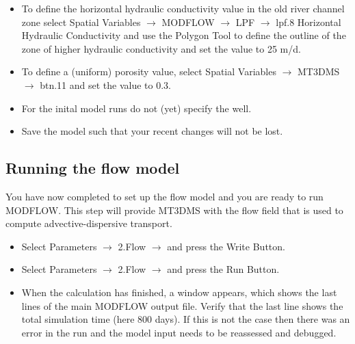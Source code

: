 \begin{itemize}
\item To define the horizontal hydraulic conductivity value in the old river channel zone
select {\color{blue}Spatial Variables} $\rightarrow$ {\color{blue}MODFLOW} $\rightarrow$ 
{\color{blue}LPF} $\rightarrow$ {\color{blue}lpf.8 Horizontal Hydraulic Conductivity} 
and use the {\color{blue}Polygon Tool} to define the outline of the zone of higher 
hydraulic conductivity and set the value to 25 m/d.
 

\item To define a (uniform) porosity value, select {\color{blue}Spatial Variables} 
$\rightarrow$ {\color{blue}MT3DMS} $\rightarrow$ {\color{blue}btn.11} 
and set the value to 0.3. 

\item For the inital model runs do not (yet) specify the well.

\item Save the model such that your recent changes will not be lost.

\end{itemize}



\subsection{Running the flow model}

You have now completed to set up the flow model and you are ready to run MODFLOW.
This step will provide MT3DMS with the flow field that is used to compute 
advective-dispersive transport.

\begin{itemize}

\item Select {\color{blue}Parameters} $\rightarrow$ {\color{blue}2.Flow} $\rightarrow$ and press 
the {\color{blue}Write Button}.

\item Select {\color{blue}Parameters} $\rightarrow$ {\color{blue}2.Flow} $\rightarrow$ and press
the {\color{blue}Run Button}.

\item When the calculation has finished, a window appears, which shows the last lines of the 
main MODFLOW output file. Verify that the last line shows the total simulation time (here 800 days).  
If this is not the case then there was an error in the run and the model input needs to be reassessed and debugged.


\end{itemize}


